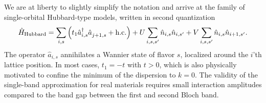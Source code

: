 We are at liberty to slightly simplify the notation and arrive at the family of single-orbital Hubbard-type models, written in second quantization
\begin{align}
    \hat H_{\rm Hubbard} = \sum_{i,s}\brlr{t_1 \hat a^\dag_{i,s}\hat a^\pdag_{j+1,s} + \hc} + U\sum_{i,s,s'}\hat n_{i,s}\hat n_{i,s'} + V\sum_{i,s,s'}\hat n_{i,s}\hat n_{i+1,s'}.
    \label{eq:hubbard_hamiltonian}
\end{align}
The operator $\hat a_{i,s}$ annihilates a Wannier state of flavor $s$, localized around the $i$'th lattice position.
In most cases, $t_1 = -t$ with $t>0$, which is also physically motivated to confine the minimum of the dispersion to $k=0$.
The validity of the single-band approximation for real materials requires small interaction amplitudes compared to the band gap between the first and second Bloch band.

